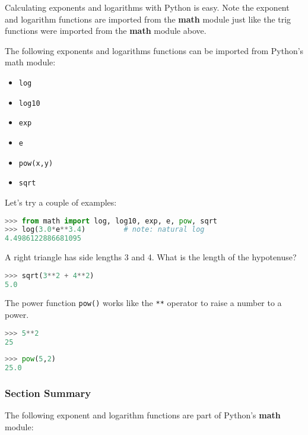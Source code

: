\documentclass{book}
\providecommand{\tightlist}{%
      \setlength{\itemsep}{0pt}\setlength{\parskip}{0pt}}
\newcommand{\passthrough}[1]{#1}
\begin{document}
    
        Calculating exponents and logarithms with Python is easy. Note the
exponent and logarithm functions are imported from the \textbf{math}
module just like the trig functions were imported from the \textbf{math}
module above.

The following exponents and logarithms functions can be imported from
Python's math module:

\begin{itemize}
\tightlist
\item
  \passthrough{\lstinline!log!}
\item
  \passthrough{\lstinline!log10!}
\item
  \passthrough{\lstinline!exp!}
\item
  \passthrough{\lstinline!e!}
\item
  \passthrough{\lstinline!pow(x,y)!}
\item
  \passthrough{\lstinline!sqrt!}
\end{itemize}

Let's try a couple of examples:

\begin{lstlisting}[language=Python]
>>> from math import log, log10, exp, e, pow, sqrt
>>> log(3.0*e**3.4)         # note: natural log
4.4986122886681095
\end{lstlisting}

A right triangle has side lengths 3 and 4. What is the length of the
hypotenuse?

\begin{lstlisting}[language=Python]
>>> sqrt(3**2 + 4**2)
5.0 
\end{lstlisting}

The power function \passthrough{\lstinline!pow()!} works like the
\passthrough{\lstinline!**!} operator to raise a number to a power.

\begin{lstlisting}[language=Python]
>>> 5**2
25
\end{lstlisting}

\begin{lstlisting}[language=Python]
>>> pow(5,2)
25.0
\end{lstlisting}

\hypertarget{section-summary}{%
\subsubsection{Section Summary}\label{section-summary}}

The following exponent and logarithm functions are part of Python's
\textbf{math} module:
\end{document}
